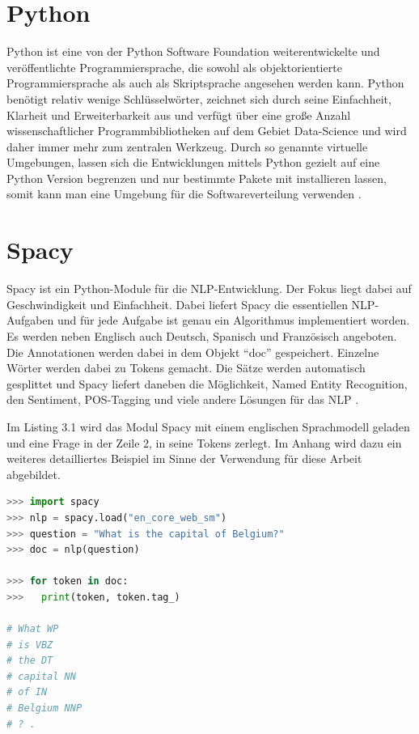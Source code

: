 \documentclass[
        ngerman,
        paper=a4,
        numbers=noendperiod,
]{scrreprt}
\begin{document}
\section{Python}
Python ist eine von der Python Software Foundation weiterentwickelte und veröffentlichte Programmiersprache, die sowohl als objektorientierte Programmiersprache als auch als Skriptsprache angesehen werden kann. Python benötigt relativ wenige Schlüsselwörter, zeichnet sich durch seine Einfachheit, Klarheit und Erweiterbarkeit aus und verfügt über eine große Anzahl wissenschaftlicher Programmbibliotheken auf dem Gebiet Data-Science und wird daher immer mehr zum zentralen Werkzeug. 
Durch so genannte virtuelle Umgebungen, lassen sich die Entwicklungen mittels Python gezielt auf eine Python Version begrenzen und nur bestimmte Pakete mit installieren lassen, somit kann man eine Umgebung für die Softwareverteilung verwenden \citep[S. 2]{GrotzGrundkurs0.1.2d}.
\section{Spacy}
Spacy ist ein Python-Module für die NLP-Entwicklung. Der Fokus liegt dabei auf Geschwindigkeit und Einfachheit. Dabei liefert Spacy die essentiellen NLP-Aufgaben und für jede Aufgabe ist genau ein Algorithmus implementiert worden. Es werden neben Englisch auch Deutsch, Spanisch und Französisch angeboten. Die Annotationen werden dabei in dem Objekt \enquote{doc} gespeichert. Einzelne Wörter werden dabei zu Tokens gemacht. Die Sätze werden automatisch gesplittet und Spacy liefert daneben die Möglichkeit, Named Entity Recognition, den Sentiment, POS-Tagging und viele andere Lösungen für das NLP \citep{SpaCyDocumentation}.

Im Listing 3.1 wird das Modul Spacy mit einem englischen Sprachmodell geladen und eine Frage in der Zeile 2, in seine Tokens zerlegt. Im Anhang wird dazu ein weiteres detailliertes Beispiel im Sinne der Verwendung für diese Arbeit abgebildet.

\begin{lstlisting}[language=Python, caption=Spacy Beispiel]
>>> import spacy
>>> nlp = spacy.load("en_core_web_sm")
>>> question = "What is the capital of Belgium?"
>>> doc = nlp(question)

>>> for token in doc:
>>>   print(token, token.tag_)

# What WP                                    
# is VBZ                                     
# the DT                                     
# capital NN            
# of IN
# Belgium NNP
# ? .

\end{lstlisting}
\end{document}
